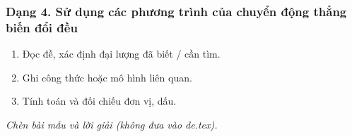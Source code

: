 \subsubsection{Dạng 4. Sử dụng các phương trình của chuyển động thẳng biến đổi đều}
\begin{phuongphap}
\begin{enumerate}
\item Đọc đề, xác định đại lượng đã biết / cần tìm.
\item Ghi công thức hoặc mô hình liên quan.
\item Tính toán và đối chiếu đơn vị, dấu.
\end{enumerate}
\end{phuongphap}
\begin{vidumau}
\textit{Chèn bài mẫu và lời giải (không đưa vào de.tex).}
\end{vidumau}

